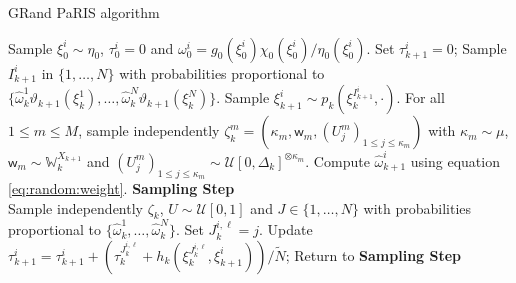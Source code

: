 \documentclass[12pt,draft]{article}
\newcommand{\eqsp}{\;}
\newcommand{\1}{\mathrm{1}}
\newcommand{\qk}{q_{k}}
\newcommand{\mw}{\mathsf{w}}%
\begin{document}
\begin{algorithm}
\caption{GRand PaRIS algorithm}
\begin{algorithmic}
\STATE Sample $\xi_0^i \sim\eta_0$, $\tau_0^i = 0$  and  $\omega_0^i = g_0(\xi_0^i)\chi_0(\xi_0^i)/\eta_0(\xi_0^i)$.
\ENDFOR
{}
\STATE Set $\tau_{k+1}^i=0$;
\STATE Sample $I_{k+1}^{i}$ in $\{1,\ldots,N\}$ with probabilities proportional to $\{\widehat{\omega}_{k}^1\vartheta_{k+1}(\xi_{k}^1),\dots,\widehat{\omega}_{k}^N\vartheta_{k+1}(\xi_{k}^N)\}$.
\STATE Sample $\xi_{k+1}^{i} \sim p_k(\xi_{k}^{I_{k+1}^{i}},\cdot)$.
\STATE For all $1\le m\le M$, sample independently $\zeta_k^m=(\kappa_m,\mw_m, (U_j^m)_{1\leq j\leq \kappa_m})$ with $\kappa_m\sim \mu$, $\mw_m\sim \mathbb{W}_k^{X_{k+1}}$ and $(U_j^m)_{1\leq j\leq \kappa_m}\sim \mathcal{U}[0,\Delta_k]^{\otimes \kappa_m}$.
\STATE Compute $\widehat{\omega}^{i}_{k+1}$ using equation \eqref{eq:random:weight}.
\STATE \textbf{\sc Sampling Step} \\
Sample independently $\zeta_k$, $U\sim \mathcal{U}[0,1]$ and $J\in\{1,\ldots,N\}$ with probabilities proportional to  $\{\widehat{\omega}_{k}^1,\dots,\widehat{\omega}_{k}^N\}$.
\IF{ $$U \leq \frac{\widehat{\qk}(\xi_{k}^J,\xi_{k+1}^i,\zeta_k)}{\hat{\sigma}^k_+},$$}
\STATE Set $J_k^{i,\ell} = j$.
\STATE Update $\tau_{k+1}^i = \tau_{k+1}^i + \left(\tau^{J_k^{i,\ell}}_{k} + h_k(\xi^{J_k^{i,\ell}}_{k},\xi^i_{k+1})\right)/\tilde{N}$;
\ELSE 
\STATE Return to \textbf{\sc Sampling Step}
\ENDIF
\ENDFOR
\ENDFOR
\ENDFOR
\end{algorithmic}
\label{alg:Ozaki:PaRIS}
\end{algorithm}
\end{document}

